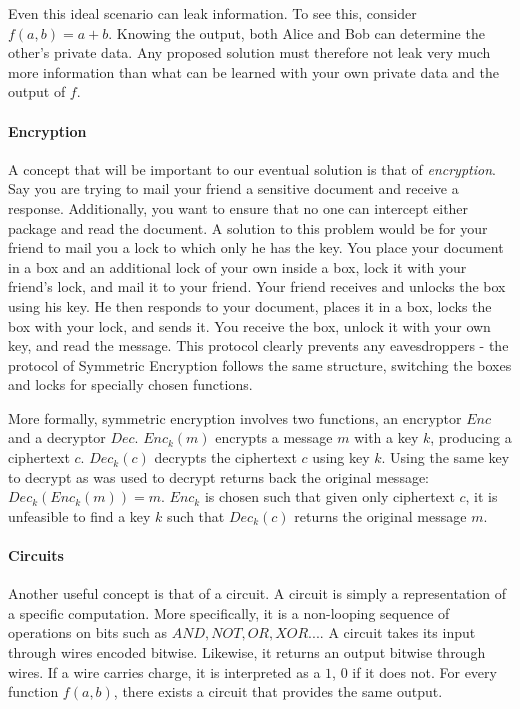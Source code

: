 Even this ideal scenario can leak information. To see this, consider $f(a, b) = a + b$. Knowing the output, both Alice and Bob can determine the other's private data. Any proposed solution must therefore not leak very much more information than what can be learned with your own private data and the output of $f$. 

\paragraph{Encryption}
A concept that will be important to our eventual solution is that of \textit{encryption}. Say you are trying to mail your friend a sensitive document and receive a response. Additionally, you want to ensure that no one can intercept either package and read the document. A solution to this problem would be for your friend to mail you a lock to which only he has the key. You place your document in a box and an additional lock of your own inside a box, lock it with your friend's lock, and mail it to your friend. Your friend receives and unlocks the box using his key. He then responds to your document, places it in a box, locks the box with your lock, and sends it. You receive the box, unlock it with your own key, and read the message. This protocol clearly prevents any eavesdroppers - the protocol of Symmetric Encryption follows the same structure, switching the boxes and locks for specially chosen functions.

More formally, symmetric encryption involves two functions, an encryptor $Enc$ and a decryptor $Dec$. $Enc_k(m)$ encrypts a message $m$ with a key $k$, producing a ciphertext $c$. $Dec_k(c)$ decrypts the ciphertext $c$ using key $k$. Using the same key to decrypt as was used to decrypt returns back the original message: $Dec_k(Enc_k(m)) = m$. $Enc_k$ is chosen such that given only ciphertext $c$, it is unfeasible to find a key $k$ such that $Dec_k(c)$ returns the original message $m$.

\paragraph{Circuits}
Another useful concept is that of a circuit. A circuit is simply a representation of a specific computation. More specifically, it is a non-looping sequence of operations on bits such as $AND, NOT, OR, XOR...$. A circuit takes its input through wires encoded bitwise. Likewise, it returns an output bitwise through wires. If a wire carries charge, it is interpreted as a $1$, $0$ if it does not. For every function $f(a,b)$, there exists a circuit that provides the same output.

